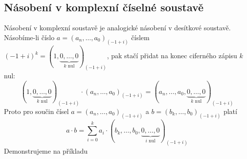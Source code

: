 \documentclass[czech,bachelor,dept470,male]{diploma}
\begin{document}
\subsection{Násobení v komplexní číselné soustavě}
Násobení v komplexní soustavě je analogické násobení v desítkové soustavě. Násobíme-li číslo $a = (a_n, \dots, a_0)_{(-1+i)}$ číslem $(-1+i)^k = (1, \underbrace{0, \dots, 0}_{k\text{ nul}})_{(-1+i)}$, pak stačí přidat na konec ciferného zápisu $k$ nul:
$$(1, \underbrace{0, \dots, 0}_{k\text{ nul}})_{(-1+i)}\cdot(a_n, \dots, a_0)_{(-1+i)} = (a_n, \dots, a_0, \underbrace{0, \dots, 0}_{k\text{ nul}})_{(-1+i)}$$
Proto pro součin čísel $a = (a_n, \dots, a_0)_{(-1+i)}$ a $b = (b_k, \dots, b_0)_{(-1+i)}$ platí
\begin{equation}\label{complexMultiplication}
	a\cdot b = \sum_{i=0}^{k} a_i\cdot(b_k, \dots, b_0, \underbrace{0, \dots, 0}_{i\text{ nul}} )_{(-1+i)}
\end{equation}
Demonstrujeme na příkladu
\end{document}
